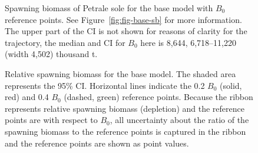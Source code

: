 \documentclass[11pt]{book}
\begin{document}
\begin{figure}[H]

{\centering {} 

}

\caption{Spawning biomass of Petrale sole for the base model with \(B_0\) reference points. See Figure~\ref{fig:fig-base-sb} for more information. The upper part of the CI is not shown for reasons of clarity for the trajectory, the median and CI for \(B_0\) here is 8,644, 6,718--11,220 (width 4,502) thousand t.}\label{fig:fig-base-sb-bo}
\end{figure}



\begin{figure}[H]

{\centering {} 

}

\caption{Relative spawning biomass for the base model. The shaded area represents the 95\% CI. Horizontal lines indicate the 0.2 \(B_0\) (solid, red) and 0.4 \(B_0\) (dashed, green) reference points. Because the ribbon represents relative spawning biomass (depletion) and the reference points are with respect to \(B_0\), all uncertainty about the ratio of the spawning biomass to the reference points is captured in the ribbon and the reference points are shown as point values.}\label{fig:fig-base-depletion}
\end{figure}
\end{document}
